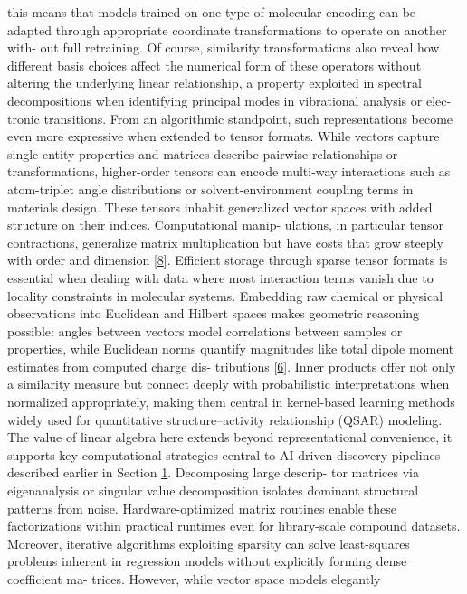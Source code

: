 \documentclass[
]{article}
\begin{document}
this means that models trained on one type of molecular encoding can be
adapted through appropriate coordinate transformations to operate on
another with- out full retraining. Of course, similarity transformations
also reveal how different basis choices affect the numerical form of
these operators without altering the underlying linear relationship, a
property exploited in spectral decompositions when identifying principal
modes in vibrational analysis or elec- tronic transitions. From an
algorithmic standpoint, such representations become even more expressive
when extended to tensor formats. While vectors capture single-entity
properties and matrices describe pairwise relationships or
transformations, higher-order tensors can encode multi-way interactions
such as atom-triplet angle distributions or solvent-environment coupling
terms in materials design. These tensors inhabit generalized vector
spaces with added structure on their indices. Computational manip-
ulations, in particular tensor contractions, generalize matrix
multiplication but have costs that grow steeply with order and dimension
{[}\hyperref[_bookmark48]{8}{]}. Efficient storage through sparse tensor
formats is essential when dealing with data where most interaction terms
vanish due to locality constraints in molecular systems. Embedding raw
chemical or physical observations into Euclidean and Hilbert spaces
makes geometric reasoning possible: angles between vectors model
correlations between samples or properties, while Euclidean norms
quantify magnitudes like total dipole moment estimates from computed
charge dis- tributions {[}\hyperref[_bookmark46]{6}{]}. Inner products
offer not only a similarity measure but connect deeply with
probabilistic interpretations when normalized appropriately, making them
central in kernel-based learning methods widely used for quantitative
structure--activity relationship (QSAR) modeling. The value of linear
algebra here extends beyond representational convenience, it supports
key computational strategies central to AI-driven discovery pipelines
described earlier in Section \hyperref[introduction]{1}. Decomposing
large descrip- tor matrices via eigenanalysis or singular value
decomposition isolates dominant structural patterns from noise.
Hardware-optimized matrix routines enable these factorizations within
practical runtimes even for library-scale compound datasets. Moreover,
iterative algorithms exploiting sparsity can solve least-squares
problems inherent in regression models without explicitly forming dense
coefficient ma- trices. However, while vector space models elegantly
\end{document}
